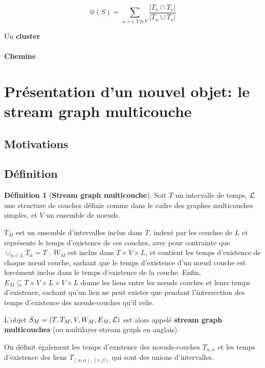 \documentclass[11pt,a4paper]{article}
\theoremstyle{definition}
\newtheorem{defn}{Définition}
\theoremstyle{remark}
\theoremstyle{remark}
\begin{document}
$$
 \Cup(S)=\sum_{u,v \in V \otimes V}\frac{|T_u\cap T_v|}{|T_u\cup T_v|}
$$

Un \textbf{cluster}

\paragraph{Chemins}


\section{Présentation d'un nouvel objet: le stream graph multicouche}



\subsection{Motivations}
\subsection{Définition}

\begin{defn}[\textbf{Stream graph multicouche}]
    
    Soit $T$ un intervalle de temps, ${\cal L}$ une structure de couches définie comme dans le cadre des graphes multicouches simples, et $V$ un ensemble de noeuds. 
    
    $T_M$ est un ensemble d'intervalles inclus dans $T$, indexé par les couches de $L$ et représente le temps d'existence de ces couches, avec pour contrainte que $\cup_{\alpha \in L} T_{\alpha} = T$ . $W_M$ est inclus dans $T \times V \times L$, et contient les temps d'existence de chaque nœud couche, sachant que le temps d'existence d'un nœud couche est forcément inclus dans le temps d'existence de la couche. Enfin, $E_M \subseteq T \times V \times L \times V \times L$ donne les liens entre les nœuds couches et leurs temps d'existence, sachant qu'un lien ne peut exister que pendant l'intersection des temps d'existence des nœuds-couches qu'il relie.
    
    L'objet $S_M = (T,T_M,V,W_M,E_M,{\cal L})$ est alors appelé \textbf{stream graph multicouches } (ou multilayer stream graph en anglais).
    
    On définit également les temps d'existence des noeuds-couches $T_{u,\alpha}$ et les temps d'existence des liens $T_{(u,\alpha),(v,\beta)}$ qui sont des unions d'intervalles.
	\end{defn}
	
\end{document}
